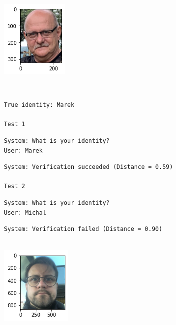 \documentclass[11pt]{article}
\begin{document}
    \begin{center}
    \includegraphics{output_32_12}
    \end{center}
    { \hspace*{\fill} \\}
    
    \begin{Verbatim}[commandchars=\\\{\}]
True identity: Marek

Test 1
    \end{Verbatim}

    \begin{Verbatim}[commandchars=\\\{\}]
System: What is your identity?
User: Marek
    \end{Verbatim}

    \begin{Verbatim}[commandchars=\\\{\}]
System: Verification succeeded (Distance = 0.59)

Test 2
    \end{Verbatim}

    \begin{Verbatim}[commandchars=\\\{\}]
System: What is your identity?
User: Michal
    \end{Verbatim}

    \begin{Verbatim}[commandchars=\\\{\}]
System: Verification failed (Distance = 0.90)


    \end{Verbatim}

    \begin{center}
    \includegraphics{output_32_18}
    \end{center}
    { \hspace*{\fill} \\}
    
\end{document}
